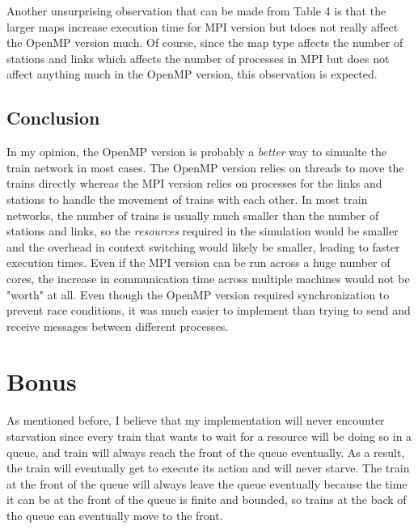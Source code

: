 \documentclass[12pt]{article}
\begin{document}
\bigbreak \noindent Another unsurprising observation that can be made from Table 4 is that the larger maps increase execution time for MPI version but tdoes not really affect the OpenMP version much. Of course, since the map type affects the number of stations and links which affects the number of processes in MPI but does not affect anything much in the OpenMP version, this observation is expected.

\subsection{Conclusion}

In my opinion, the OpenMP version is probably a \textit{better} way to simualte the train network in most cases. The OpenMP version relies on threads to move the trains directly whereas the MPI version relies on processes for the links and stations to handle the movement of trains with each other. In most train networks, the number of trains is usually much smaller than the number of stations and links, so the \textit{resources} required in the simulation would be smaller and the overhead in context switching would likely be smaller, leading to faster execution times. Even if the MPI version can be run across a huge number of cores, the increase in communication time across multiple machines would not be "worth" at all. Even though the OpenMP version required synchronization to prevent race conditions, it was much easier to implement than trying to send and receive messages between different processes.


\section{Bonus}

As mentioned before, I believe that my implementation will never encounter starvation since every train that wants to wait for a resource will be doing so in a queue, and train will always reach the front of the queue eventually. As a result, the train will eventually get to execute its action and will never starve. The train at the front of the queue will always leave the queue eventually because the time it can be at the front of the queue is finite and bounded, so trains at the back of the queue can eventually move to the front.
\end{document}
